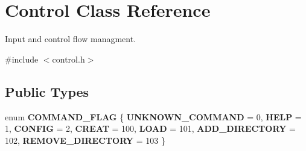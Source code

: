 \hypertarget{class_control}{}\section{Control Class Reference}
\label{class_control}


Input and control flow managment.  




{\ttfamily \#include $<$control.\+h$>$}

\subsection*{Public Types}
\begin{DoxyCompactItemize}
\item 
\mbox{\label{class_control_a611d69b6e2dd463089387b8ef867e939}} 
enum {\bfseries C\+O\+M\+M\+A\+N\+D\+\_\+\+F\+L\+AG} \{ \newline
{\bfseries U\+N\+K\+N\+O\+W\+N\+\_\+\+C\+O\+M\+M\+A\+ND} = 0, 
{\bfseries H\+E\+LP} = 1, 
{\bfseries C\+O\+N\+F\+IG} = 2, 
{\bfseries C\+R\+E\+AT} = 100, 
\newline
{\bfseries L\+O\+AD} = 101, 
{\bfseries A\+D\+D\+\_\+\+D\+I\+R\+E\+C\+T\+O\+RY} = 102, 
{\bfseries R\+E\+M\+O\+V\+E\+\_\+\+D\+I\+R\+E\+C\+T\+O\+RY} = 103
 \}
\end{DoxyCompactItemize}
